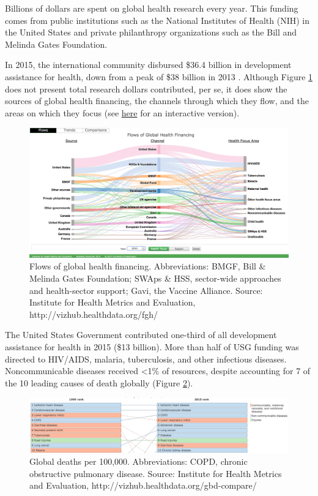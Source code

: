 \documentclass[justified,twoside,symmetric,]{tufte-book}
\renewcommand*{\citep}[1]{{\cite{#1}}}
\begin{document}
Billions of dollars are spent on global health research every year. This funding comes from public institutions such as the National Institutes of Health (NIH) in the United States and private philanthropy organizations such as the Bill and Melinda Gates Foundation.

In 2015, the international community disbursed \$36.4 billion in development assistance for health, down from a peak of \$38 billion in 2013 \citep{ihme:2016}. Although Figure \ref{fig:funding} does not present total research dollars contributed, per se, it does show the sources of global health financing, the channels through which they flow, and the areas on which they focus (see \href{http://vizhub.healthdata.org/fgh/}{here} for an interactive version).

\begin{figure}
\includegraphics{images/ihmefunding} \caption[Flows of global health financing]{Flows of global health financing. Abbreviations: BMGF, Bill \& Melinda Gates Foundation; SWAps \& HSS, sector-wide approaches and health-sector support; Gavi, the Vaccine Alliance. Source: Institute for Health Metrics and Evaluation, http://vizhub.healthdata.org/fgh/}\label{fig:funding}
\end{figure}

The United States Government contributed one-third of all development assistance for health in 2015 (\$13 billion). More than half of USG funding was directed to HIV/AIDS, malaria, tuberculosis, and other infectious diseases. Noncommunicable diseases received \textless1\% of resources, despite accounting for 7 of the 10 leading causes of death globally (Figure \ref{fig:cod}).

\begin{figure}
\includegraphics{images/cod} \caption[Global deaths per 100,000]{Global deaths per 100,000. Abbreviations: COPD, chronic obstructive pulmonary disease. Source: Institute for Health Metrics and Evaluation, http://vizhub.healthdata.org/gbd-compare/}\label{fig:cod}
\end{figure}
\end{document}

